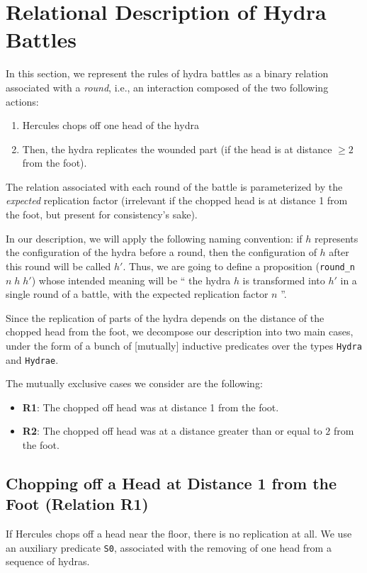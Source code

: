 \section{Relational Description of Hydra Battles}


In this section, we represent the rules of hydra battles as a binary relation associated with
a \emph{round}, i.e., an interaction composed of the two following actions:
\begin{enumerate}
\item Hercules chops off one head of the hydra
\item Then, the  hydra replicates the wounded part (if the head is at distance $\geq 2$ from the foot).
\end{enumerate}
The relation associated with each round of the battle is parameterized  by the \emph{expected} replication  factor (irrelevant if the chopped head is at distance 1 from the foot,
but present for consistency's sake).

In our description,  we will apply the following naming convention: if $h$ represents the configuration of the hydra before a round, then the configuration of $h$ after this round will be called $h'$.
 Thus, we are going to define a proposition  (\texttt{round\_n $n\;h\;h'$})  whose intended meaning will be `` the hydra $h$  is transformed into $h'$  in a single round of a battle, with the expected replication factor $n$ ''.


Since the replication of parts of the hydra depends on the distance of the chopped head from  the foot, we  decompose our description into two main  cases, under the form of a bunch of [mutually] inductive predicates over the types \texttt{Hydra} and \texttt{Hydrae}.

The mutually exclusive cases we consider are the following:
\begin{itemize}
\item \textbf{R1}: The chopped off head was at distance 1 from the foot.
\item \textbf{R2}: The chopped off head was at a distance greater than or equal to  $2$ from the foot.
\end{itemize}



\subsection{Chopping off a Head at Distance 1 from the Foot (Relation  R1)}

If Hercules chops off a head near the floor, there is no replication at all. We use an auxiliary 
predicate \texttt{S0}, associated with the removing of one head from a sequence of hydras.


